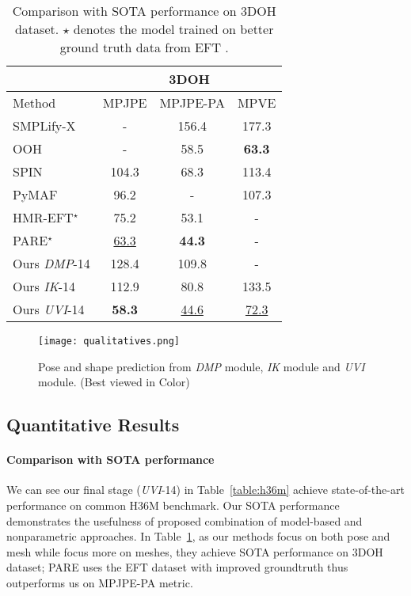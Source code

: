 \documentclass[10pt,twocolumn,letterpaper]{article}
\begin{document}
\begin{table}
\begin{center}
\small
\begin{tabular}{l|c|c |c}
\hline
      &  \multicolumn{3}{c}{3DOH}  \\
\hline
Method  & MPJPE & MPJPE-PA & MPVE\\
\hline
SMPLify-X  &  -  & 156.4   &  177.3\\
OOH \cite{cvprooh}  &  -  & 58.5   &  \textbf{63.3}\\
SPIN \cite{spin}   &   104.3 & 68.3 & 113.4\\
PyMAF\cite{pymaf}   &   96.2 & - & 107.3\\
HMR-EFT$^{\star}$ \cite{EFT} &   75.2 & 53.1 & -\\
PARE$^{\star}$ \cite{pare}  &  \underline{63.3} & \textbf{44.3}  & -\\
\hline
Ours \textit{DMP}-14    & 128.4 & 109.8  & - \\
Ours \textit{IK}-14    & 112.9  & 80.8 & 133.5\\
Ours \textit{UVI}-14    &  \textbf{58.3} &  \underline{44.6} &  \underline{72.3}   \\
\hline
\end{tabular}
\end{center}
\caption{Comparison with SOTA performance on 3DOH dataset. $\star$ denotes the model trained on better ground truth data from EFT \cite{EFT}. }
\label{table:3doh}
\end{table}



\begin{figure*}[t]
\begin{center}
   \texttt{[image: qualitatives.png]}
\end{center}
   \caption{Pose and shape prediction from \textit{DMP} module, \textit{IK} module and \textit{UVI} module. (Best viewed in Color) }
\label{fig:qualitative}
\end{figure*}








\subsection{Quantitative Results}

\paragraph{Comparison with SOTA performance} We can see our final stage (\textit{UVI}-14) in Table~\ref{table:h36m} achieve state-of-the-art performance on common H36M benchmark. Our SOTA performance demonstrates the usefulness of proposed combination of model-based and nonparametric approaches. In Table~\ref{table:3doh}, as our methods focus on both pose and mesh while \cite{cvprooh} focus more on meshes, they achieve SOTA performance on 3DOH dataset; PARE \cite{pare} uses the  EFT dataset \cite{EFT} with improved groundtruth  thus outperforms us on MPJPE-PA metric.  
\end{document}
